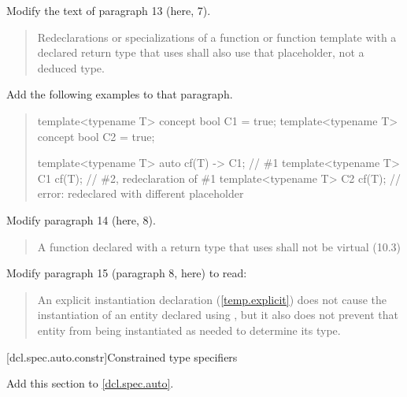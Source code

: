 Modify the text of paragraph 13 (here, 7).

\begin{quote}
\setcounter{Paras}{6}
\pnum
Redeclarations or specializations of a function or function template 
with a declared return type that uses 
 shall also use that placeholder, 
not a deduced type.
% 
\end{quote}

Add the following examples to that paragraph.

\begin{quote}
\begin{addedblock}
\begin{codeblock}
template<typename T> concept bool C1 = true;
template<typename T> concept bool C2 = true;

template<typename T> auto cf(T) -> C1; // \#1
template<typename T> C1 cf(T);         // \#2, redeclaration of \#1
template<typename T> C2 cf(T);         // error: redeclared with different placeholder
\end{codeblock}
\end{addedblock}
\end{quote}

Modify paragraph 14 (here, 8).

\begin{quote}
\pnum
A function declared with a return type that uses 
shall not be virtual (10.3)
\end{quote}


Modify paragraph 15 (paragraph 8, here) to read:

\begin{quote}
\setcounter{Paras}{7}
\pnum
An explicit instantiation declaration (\ref{temp.explicit}) does not cause the 
instantiation of an entity declared using 
,
but it also does not prevent that entity from being instantiated as needed to
determine its type. 
\end{quote}

[dcl.spec.auto.constr]{Constrained type specifiers}

Add this section to \ref{dcl.spec.auto}.

